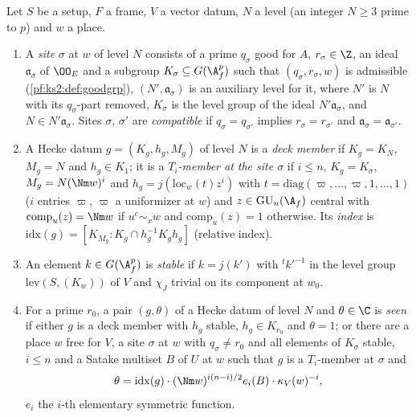 \begin{definition}\label{pf:geo:site}
Let $S$ be a setup, $F$ a frame, $V$ a vector datum, $N$ a level (an integer $N\ge3$ prime to $p$) and $w$ a place.
\begin{enumerate}[label=(\alph*),nosep]
\item A \emph{site} $\sigma$ at $w$ of level $N$ consists of a prime $q_\sigma$ good for $A$, $r_\sigma\in\Z$, an ideal $\mathfrak
  a_\sigma$ of $\OO_E$ and a subgroup $K_\sigma\subseteq G(\A_f^p)$ such that $(q_\sigma,r_\sigma,w)$ is admissible
  (\cref{pf:ks2:def:goodgrp}), $(N',\mathfrak a_\sigma)$ is an auxiliary level for it, where $N'$ is $N$ with its
  $q_\sigma$-part removed, $K_\sigma$ is the level group of the ideal $N'\mathfrak a_\sigma$, and $N\in N'\mathfrak a_\sigma$. Sites $\sigma$, $\sigma'$
  are \emph{compatible} if $q_\sigma=q_{\sigma'}$ implies $r_\sigma=r_{\sigma'}$ and $\mathfrak a_\sigma=\mathfrak a_{\sigma'}$.
\item A Hecke datum $g=(K_g,h_g,M_g)$ of level $N$ is a \emph{deck member} if $K_g=K_N$, $M_g=N$ and $h_g\in K_1$; it is a
  \emph{$T_i$-member at the site $\sigma$} if $i\le n$, $K_g=K_\sigma$, $M_g=N(\Nm w)^i$ and $h_g=j(\mathrm{loc}_w(t)z^i)$ with
  $t=\mathrm{diag}(\varpi,\dots,\varpi,1,\dots,1)$ ($i$ entries $\varpi$, $\varpi$ a uniformizer at $w$) and $z\in\geoGU_n(\A_f)$
  central with $\mathrm{comp}_u(z)=\Nm w$ if $u^c\sim_xw$ and $\mathrm{comp}_u(z)=1$ otherwise. Its \emph{index} is
  $\mathrm{idx}(g)=[K_{M_g}:K_g\cap h_g^{-1}K_gh_g]$ (relative index).
\item An element $k\in G(\A_f^p)$ is \emph{stable} if $k=j(k')$ with ${}^tk'^{-1}$ in the level group $\mathrm{lev}(S,(K_w))$ of $V$
  and $\chi_J$ trivial on its component at $w_0$.
\item For a prime $r_0$, a pair $(g,\theta)$ of a Hecke datum of level $N$ and $\theta\in\C$ is \emph{seen} if either $g$ is a deck
  member with $h_g$ stable, $h_g\in K_{r_0}$ and $\theta=1$; or there are a place $w$ free for $V$, a site $\sigma$ at $w$ with
  $q_\sigma\ne r_0$ and all elements of $K_\sigma$ stable, $i\le n$ and a Satake multiset $B$ of $U$ at $w$ such that $g$ is a
  $T_i$-member at $\sigma$ and
  \[
    \theta=\mathrm{idx}(g)\cdot(\Nm w)^{i(n-i)/2}e_i(B)\cdot\kappa_V(w)^{-i},
  \]
  $e_i$ the $i$-th elementary symmetric function.
\end{enumerate}
\end{definition}

